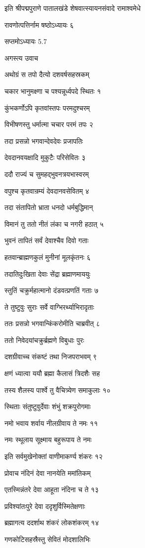 इति श्रीपद्मपुराणे पातालखंडे शेषवात्स्यायनसंवादे रामाश्वमेधे

रावणोत्पत्तिर्नाम षष्ठोऽध्यायः ६

सप्तमोऽध्यायः 5.7

अगस्त्य उवाच

अथोग्रं स तपो दैत्यो दशवर्षसहस्रकम्

चकार भानुमक्ष्णा च पश्यन्नूर्ध्वपदे स्थितः १

कुंभकर्णोऽपि कृतवांस्तपः परमदुश्चरम्

विभीषणस्तु धर्मात्मा चचार परमं तपः २

तदा प्रसन्नो भगवान्देवदेवः प्रजापतिः

देवदानवयक्षादि मुकुटैः परिसेवितः ३

ददौ राज्यं च सुमहद्भुवनत्रयभास्वरम्

वपुश्च कृतवान्रम्यं देवदानवसेवितम् ४

तदा संतापितो भ्राता धनदो धर्मबुद्धिमान्

विमानं तु ततो नीतं लंका च नगरी हठात् ५

भुवनं तापितं सर्वं देवाश्चैव दिवो गताः

हतवान्ब्राह्मणकुलं मुनीनां मूलकृंतनः ६

तदातिदुःखिता देवाः सेंद्रा ब्रह्माणमाययुः

स्तुतिं चक्रुर्महात्मानो दंडवत्प्रणतिं गताः ७

ते तुष्टुवुः सुराः सर्वे वाग्भिरर्थ्याभिरादृताः

ततः प्रसन्नो भगवान्किंकरोमीति चाब्रवीत् ८

ततो निवेदयांचक्रुर्ब्रह्मणे विबुधाः पुरः

दशग्रीवाच्च संकष्टं तथा निजपराभवम् ९

क्षणं ध्यात्वा ययौ ब्रह्मा कैलासं त्रिदशैः सह

तस्य शैलस्य पार्श्वे तु वैचित्र्येण समाकुलाः १०

स्थिताः संतुष्टुवुर्देवाः शंभुं शक्रपुरोगमाः

नमो भवाय शर्वाय नीलग्रीवाय ते नमः ११

नमः स्थूलाय सूक्ष्माय बहुरूपाय ते नमः

इति सर्वमुखेनोक्तां वाणीमाकर्ण्य शंकरः १२

प्रोवाच नंदिनं देवा नानयेति ममांतिकम्

एतस्मिन्नंतरे देवा आहूता नंदिना च ते १३

प्रविश्यांतःपुरे देवा ददृशुर्विस्मितेक्षणाः

ब्रह्मागत्य ददर्शाथ शंकरं लोकशंकरम् १४

गणकोटिसहस्रैस्तु सेवितं मोदशालिभिः

